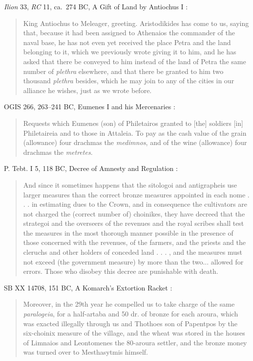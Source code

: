 \documentclass{article}
\begin{document}
{\em Ilion} 33, {\em RC} 11, ca.~274 BC, A Gift of Land by Antiochus I \cite[p.~37]{hellenistic2004}:

\begin{quote}
King Antiochus to Meleager, greeting. Aristodikides has come to us, saying
that, because it had been assigned to Athenaios the commander of the naval
base, he has not even yet received the place Petra and the land belonging to
it, which we previously wrote giving it to him, and he has asked that there
be conveyed to him instead of the land of Petra the same number of {\em plethra}
elsewhere, and that there be granted to him two thousand {\em plethra} besides,
which he may join to any of the cities in our alliance he wishes, just as we
wrote before. 
\end{quote}

OGIS 266, 263--241 BC, Eumenes I and his Mercenaries \cite[p.~46]{hellenistic2004}:

\begin{quote}
Requests which Eumenes (son) of Philetairos granted to [the] soldiers [in]
Philetaireia and to those in Attaleia. To pay as the cash value of the grain
(allowance) four drachmas the {\em medimnos}, and of the wine (allowance) four
drachmas the {\em metretes}. 
\end{quote}

P. Tebt. I 5, 118 BC, Decree of Amnesty and Regulation \cite[p.~98]{hellenistic2004}:

\begin{quote}
And since it sometimes happens that the sitologoi and antigrapheis use larger
measures than the correct bronze measures appointed in each nome . . . in
estimating dues to the Crown, and in consequence the cultivators are
not charged the (correct number of) choinikes, they have decreed that
the strategoi and the overseers of the revenues and the royal scribes shall
test the measures in the most thorough manner possible in the presence
of those concerned with the revenues, of the farmers, and the priests
and the cleruchs and other holders of conceded land . . . , and the measures
must not exceed (the government measure) by more than the two...
allowed for errors. Those who disobey this decree are punishable with
death.
\end{quote}

SB XX 14708, 151 BC, A Komarch's Extortion Racket \cite[p.~159]{hellenistic2004}:

\begin{quote}
Moreover, in the 29th year he compelled us to take charge of the same {\em paralogeia},
for a half-artaba and 50 dr. of bronze for each aroura, which was
exacted illegally through us and Thothoes son of Papentpos by the six-choinix
measure of the village, and the wheat was stored in the houses of Limnaios
and Leontomenes the 80-aroura settler, and the bronze money was turned
over to Mesthasytmis himself. 
\end{quote}
\end{document}
